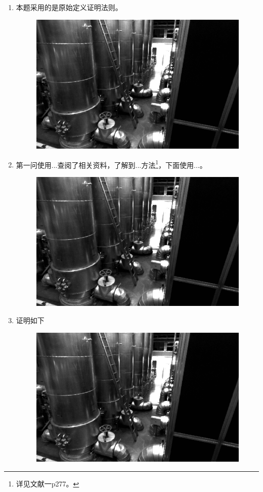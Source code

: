 \documentclass[
	12pt, %
]{fphw} %
\begin{document}
\begin{enumerate}
	\item 本题采用的是原始定义证明法则。
	\begin{figure}[h]
		\centering
		\includegraphics[width=1.0\columnwidth]{pic1.png} %
	\end{figure}
	\item 第一问使用...查阅了相关资料\cite{matrix}，了解到...方法\footnote{详见文献一p277。}，下面使用...。
	\begin{figure}[H]
		\centering
		\includegraphics[width=1.0\columnwidth]{pic1.png} %
	\end{figure}
	\item 证明如下
	\begin{figure}[H]
		\centering
		\includegraphics[width=1.0\columnwidth]{pic1.png} %

\end{figure}
\end{enumerate}
\end{document}
